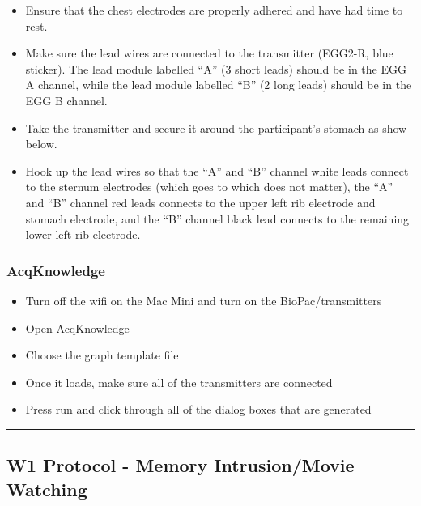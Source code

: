 \documentclass[]{book}
\providecommand{\tightlist}{%
  \setlength{\itemsep}{0pt}\setlength{\parskip}{0pt}}
\begin{document}
\begin{itemize}
\tightlist
\item
  Ensure that the chest electrodes are properly adhered and have had time to rest.
\item
  Make sure the lead wires are connected to the transmitter (EGG2-R, blue sticker). The lead module labelled ``A'' (3 short leads) should be in the EGG A channel, while the lead module labelled ``B'' (2 long leads) should be in the EGG B channel.
\item
  Take the transmitter and secure it around the participant's stomach as show below.
\item
  Hook up the lead wires so that the ``A'' and ``B'' channel white leads connect to the sternum electrodes (which goes to which does not matter), the ``A'' and ``B'' channel red leads connects to the upper left rib electrode and stomach electrode, and the ``B'' channel black lead connects to the remaining lower left rib electrode.
\end{itemize}

\hypertarget{acqknowledge}{%
\subsubsection{AcqKnowledge}\label{acqknowledge}}

\begin{itemize}
\tightlist
\item
  Turn off the wifi on the Mac Mini and turn on the BioPac/transmitters
\item
  Open AcqKnowledge
\item
  Choose the graph template file
\item
  Once it loads, make sure all of the transmitters are connected
\item
  Press run and click through all of the dialog boxes that are generated
\end{itemize}

\begin{center}\rule{0.5\linewidth}{0.5pt}\end{center}

\hypertarget{w1-protocol---memory-intrusionmovie-watching}{%
\subsection{W1 Protocol - Memory Intrusion/Movie Watching}\label{w1-protocol---memory-intrusionmovie-watching}}
\end{document}
